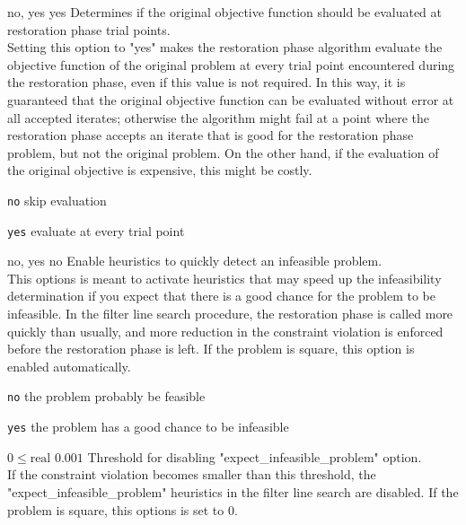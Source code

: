 %
{\ttfamily no, yes}%
{yes}%
{Determines if the original objective function should be evaluated at restoration phase trial points.\\
Setting this option to "yes" makes the restoration phase algorithm evaluate the objective function of the original problem at every trial point encountered during the restoration phase, even if this value is not required.  In this way, it is guaranteed that the original objective function can be evaluated without error at all accepted iterates; otherwise the algorithm might fail at a point where the restoration phase accepts an iterate that is good for the restoration phase problem, but not the original problem.  On the other hand, if the evaluation of the original objective is expensive, this might be costly.}%
{\begin{list}{}{
\setlength{\parsep}{0em}
\setlength{\leftmargin}{5ex}
\setlength{\labelwidth}{2ex}
\setlength{\itemindent}{0ex}
\setlength{\topsep}{0pt}}
\item[\texttt{no}] skip evaluation
\item[\texttt{yes}] evaluate at every trial point
\end{list}
}

%
{\ttfamily no, yes}%
{no}%
{Enable heuristics to quickly detect an infeasible problem.\\
This options is meant to activate heuristics that may speed up the infeasibility determination if you expect that there is a good chance for the problem to be infeasible.  In the filter line search procedure, the restoration phase is called more quickly than usually, and more reduction in the constraint violation is enforced before the restoration phase is left. If the problem is square, this option is enabled automatically.}%
{\begin{list}{}{
\setlength{\parsep}{0em}
\setlength{\leftmargin}{5ex}
\setlength{\labelwidth}{2ex}
\setlength{\itemindent}{0ex}
\setlength{\topsep}{0pt}}
\item[\texttt{no}] the problem probably be feasible
\item[\texttt{yes}] the problem has a good chance to be infeasible
\end{list}
}

%
{$0\leq\textrm{real}$}%
{$0.001$}%
{Threshold for disabling "expect\_infeasible\_problem" option.\\
If the constraint violation becomes smaller than this threshold, the "expect\_infeasible\_problem" heuristics in the filter line search are disabled. If the problem is square, this options is set to 0.}%
{}


